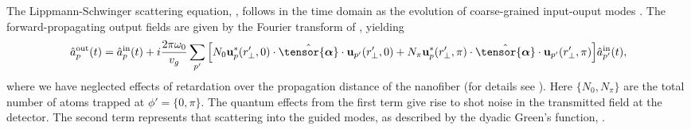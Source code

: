 \documentclass[preprint, aps,pra,onecolumn]{revtex4-1} %
\newcommand{\poltens}{\hat{\tensor{\boldsymbol{\alpha}}}}
\newcommand{\error}[1]{{\color{red} #1}}
\begin{document}
The Lippmann-Schwinger scattering equation, , follows in the time domain as the evolution of \error{coarse-grained} input-ouput modes \cite{gardiner_input_1985, fan_input-output_2010, le_kien_propagation_2014}.  
The forward-propagating output fields are given by the Fourier transform of , yielding \cite{le_kien_correlations_2008} 
\begin{align} \label{Eq::ScatteringSolution}
		\hat{a}^{\rm out}_{p}(t) = \hat{a}^{\rm in}_{p}(t) + i  \frac{2\pi \omega_0}{v_g}\sum_{p'}\Big[ N_0  \mathbf{u}^*_p(r'_\perp,0) \cdot \poltens \cdot  \mathbf{u}_{p'}(r'_\perp,0)  + N_\pi \mathbf{u}^*_p(r'_\perp,\pi) \cdot \poltens \cdot  \mathbf{u}_{p'}(r'_\perp,\pi) \Big] \hat{a}^{\rm in}_{p'}(t),
	\end{align} 
where we have neglected effects of retardation over the propagation distance of the nanofiber (for details see \cite{BenDissertation}).  
Here $\{N_0,N_\pi \}$ are the total number of atoms trapped at $\phi' = \{0,\pi\}$. 
The quantum effects from the first term give rise to shot noise in the transmitted field at the detector.  
The second term represents that scattering into the guided modes, as described by the dyadic Green's function, .  
\end{document}

